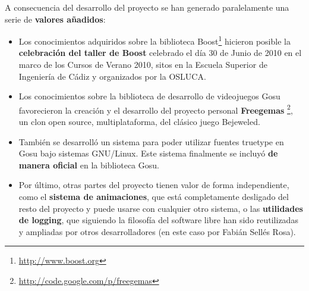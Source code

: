 \documentclass{article}
\begin{document}
A consecuencia del desarrollo del proyecto se han generado
paralelamente una serie de \textbf{valores añadidos}:
\begin{itemize}
\item Los conocimientos adquiridos sobre la biblioteca
  Boost\footnote{\url{http://www.boost.org}} hicieron posible la
  \textbf{celebración del taller de Boost} celebrado el día 30 de
  Junio de 2010 en el marco de los Cursos de Verano 2010, sitos en la
  Escuela Superior de Ingeniería de Cádiz y organizados por la OSLUCA.
\item Los conocimientos sobre la biblioteca de desarrollo de
  videojuegos Gosu favorecieron la creación y el desarrollo del
  proyecto personal \textbf{Freegemas}
  \footnote{\url{http://code.google.com/p/freegemas}}, un clon open source,
  multiplataforma, del clásico juego Bejeweled.
\item También se desarrolló un sistema para poder utilizar fuentes
  truetype en Gosu bajo sistemas GNU/Linux. Este sistema finalmente se
  incluyó \textbf{de manera oficial} en la biblioteca Gosu.
\item Por último, otras partes del proyecto tienen valor de forma
  independiente, como el \textbf{sistema de animaciones}, que está
  completamente desligado del resto del proyecto y puede usarse con
  cualquier otro sistema, o las \textbf{utilidades de logging}, que
  siguiendo la filosofía del software libre han sido reutilizadas y
  ampliadas por otros desarrolladores (en este caso por Fabián Sellés
  Rosa).
\end{itemize}
\end{document}
